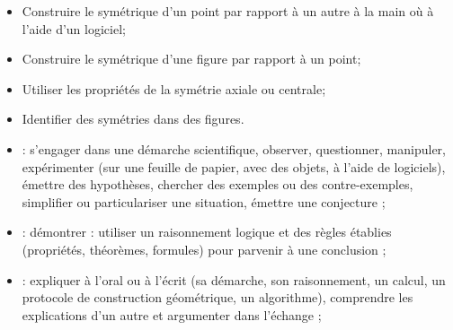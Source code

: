 \begin{myobj}
	\begin{itemize}
		\item Construire le symétrique d’un point par rapport à un autre à la main où à l’aide d’un logiciel;
		\item Construire le symétrique d’une figure par rapport à un point;
		\item Utiliser les propriétés de la symétrie axiale ou centrale;
		\item Identifier des symétries dans des figures.		
	\end{itemize}
\end{myobj}

\begin{mycomp}
	\begin{itemize}
		\item {} :  s’engager    dans    une    démarche    scientifique, observer, questionner, manipuler, expérimenter (sur une feuille de papier, avec des objets, à l’aide de logiciels), émettre des hypothèses, chercher des exemples ou des contre-exemples, simplifier ou particulariser une situation, émettre une conjecture ;
		\item {} :  démontrer : utiliser un raisonnement logique et des règles établies (propriétés, théorèmes, formules) pour parvenir à une conclusion ;
		\item {} :  expliquer à l’oral ou à l’écrit (sa démarche, son raisonnement, un calcul, un protocole   de   construction   géométrique, un algorithme), comprendre les explications d’un autre et argumenter dans l’échange ; 
		
	\end{itemize}
\end{mycomp}